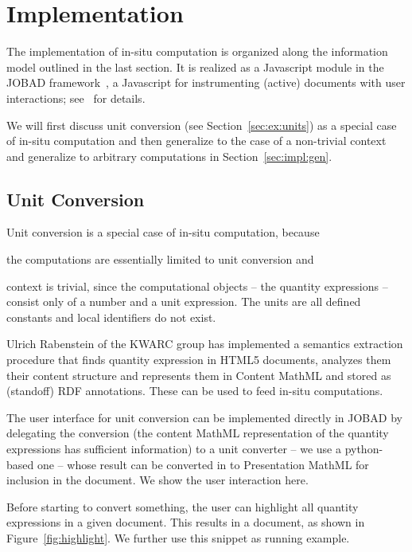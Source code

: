 \section{Implementation}\label{sec:impl}
 The
implementation of in-situ computation is organized along the information model outlined in
the last section. It is realized as a Javascript module in the JOBAD
framework~\cite{JOBAD:on}, a Javascript for instrumenting (active) documents with user
interactions; see~\cite{GLR:WebSvcActMathDoc09} for details.

We will first discuss unit conversion (see Section~\ref{sec:ex:units}) as a special case
of in-situ computation and then generalize to the case of a non-trivial context and
generalize to arbitrary computations in Section~\ref{sec:impl:gen}.
  
\subsection{Unit Conversion}
Unit conversion is a special case of in-situ computation, because
\begin{compactitem}
\item the computations are essentially limited to unit conversion and
\item context is trivial, since the computational objects -- the quantity expressions --
  consist only of a number and a unit expression. The units are all defined constants and
  local identifiers do not exist.
\end{compactitem}
Ulrich Rabenstein of the KWARC group has implemented a semantics extraction procedure that
finds quantity expression in HTML5 documents, analyzes them their content structure and
represents them in Content MathML and stored as (standoff) RDF annotations. These can be
used to feed in-situ computations.

The user interface for unit conversion can be implemented directly in JOBAD by delegating
the conversion (the content MathML representation of the quantity expressions has
sufficient information) to a unit converter -- we use a python-based one -- whose result
can be converted in to Presentation MathML for inclusion in the document. We show the user
interaction here.

Before starting to convert something, the user can highlight all quantity
expressions in a given document. This results in a document, as shown in
Figure~\ref{fig:highlight}. We further use this snippet as running example.

